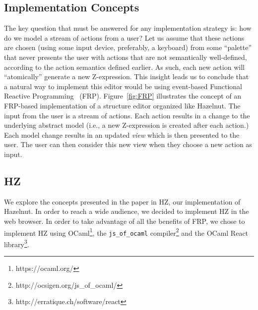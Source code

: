 \subsection{Implementation Concepts}











The key question that must be answered for any implementation strategy is: how do we model a stream of actions from a user? Let us assume that these actions are chosen (using some input device, preferably, a keyboard) from some ``palette'' that never presents the user with actions that are not semantically well-defined, according to the action semantics defined earlier.
As such, each new action will ``atomically'' generate a new Z-expression. 
This insight leads us to conclude that a natural way to implement this editor would be using event-based Functional Reactive Programming~\cite{Wan:2000:FRP:349299.349331} (FRP).
Figure~\ref{fig:FRP} illustrates the concept of an FRP-based implementation of a  structure editor organized like Hazelnut.
The input from the user is a stream of actions.  Each action results in a change to the underlying abstract model (i.e., a new Z-expression is created after each action.)
Each model change results in an updated \emph{view} which is then presented to the user.  The user can then consider this new view when they choose a new action as input.

\subsection{HZ}
We explore the concepts presented in the paper in HZ, our implementation of Hazelnut.
In order to reach a wide audience, we decided to implement HZ in the web browser.
In order to take advantage of all the benefits of FRP, we chose to implement HZ using OCaml\footnote{https://ocaml.org/}, the \texttt{js\_of\_ocaml} compiler\footnote{http://ocsigen.org/js\_of\_ocaml/} and the OCaml React library\footnote{http://erratique.ch/software/react}.

